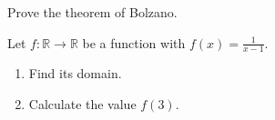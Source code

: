 \begin{schltask}
\item {}\par
  Prove the theorem of Bolzano.
\item {}\par
  Let $f:\mathbb{R}\rightarrow\mathbb{R}$ be a function with $f(x) = \frac1{x-1}$.
  \begin{enumerate}
  \item {} Find its domain.
  \item {} Calculate the value $f(3)$.
  \end{enumerate}
\end{schltask}